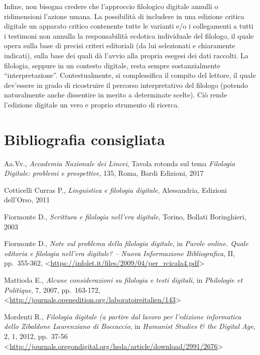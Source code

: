 \documentclass[
  b5paper,
  twoside,
  11pt,
  chapterprefix=false,
  bibliography=totocnumbered,
  parskip=0]{scrbook}
\begin{document}
Infine, non bisogna credere che l'approccio filologico digitale annulli
o ridimensioni l'azione umana. La possibilità di includere in una
edizione critica digitale un apparato critico contenente tutte le
varianti e/o i collegamenti a tutti i testimoni non annulla la
responsabilità ecdotica individuale del filologo, il quale opera sulla
base di precisi criteri editoriali (da lui selezionati e chiaramente
indicati), sulla base dei quali dà l'avvio alla propria esegesi dei dati
raccolti. La filologia, seppure in un contesto digitale, resta sempre
sostanzialmente \enquote{interpretazione}. Contestualmente, si complessifica il
compito del lettore, il quale dev'essere in grado di ricostruire il
percorso interpretativo del filologo (potendo naturalmente anche
dissentire in merito a determinate scelte). Ciò rende l'edizione
digitale un vero e proprio strumento di ricerca.

\hypertarget{bibliografia-consigliata-10}{%
\section*{Bibliografia consigliata}\label{bibliografia-consigliata-10}}

Aa.Vv., \emph{Accademia Nazionale dei Lincei}, Tavola rotonda sul tema
\emph{Filologia Digitale: problemi e prospettive}, 135, Roma, Bardi Edizioni,
2017

Cotticelli Curras P., \emph{Linguistica e filologia digitale}, Alessandria,
Edizioni dell'Orso, 2011

Fiormonte D., \emph{Scrittura e filologia nell'era digitale}, Torino, Bollati
Boringhieri, 2003

Fiormonte D., \emph{Note sul problema della filologia digitale}, in \emph{Parole
online. Quale editoria e filologia nell'era digitale? -- Nuova
Informazione Bibliografica}, II, pp.~355-362,
\textless{}\href{https://infolet.it/files/2009/04/per_rcicala4.pdf}{{https://infolet.it/files/2009/04/per\_rcicala4.pdf}}\textgreater{}

Mattioda E., \emph{Alcune considerazioni su filologia e testi digitali}, in
\emph{Philologie et Politique}, 7, 2007, pp.~163-172,
\textless{}{\url{http://journals.openedition.org/laboratoireitalien/143}\textgreater{}}

Mordenti R., \emph{Filologia digitale (a partire dal lavoro per l'edizione
informatica dello Zibaldone Laurenziano di Boccaccio}, in \emph{Humanist
Studies \& the Digital Age}, 2, 1, 2012, pp.~37-56
\textless{}\href{http://journals.oregondigital.org/hsda/article/download/2991/2676}{{http://journals.oregondigital.org/hsda/article/download/2991/2676}}\textgreater{}
\end{document}
